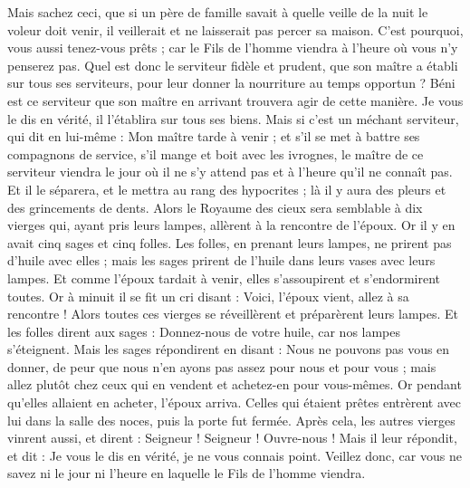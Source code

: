 \begin{multicols}{2}
Mais sachez ceci, que si un père de famille savait à quelle veille de la nuit le voleur doit venir, il veillerait et ne laisserait pas percer sa maison.
C'est pourquoi, vous aussi tenez-vous prêts ; car le Fils de l'homme viendra à l'heure où vous n'y penserez pas.
Quel est donc le serviteur fidèle et prudent, que son maître a établi sur tous ses serviteurs, pour leur donner la nourriture au temps opportun ?
Béni est ce serviteur que son maître en arrivant trouvera agir de cette manière.
Je vous le dis en vérité, il l'établira sur tous ses biens.
Mais si c'est un méchant serviteur, qui dit en lui-même : Mon maître tarde à venir ;
et s'il se met à battre ses compagnons de service, s'il mange et boit avec les ivrognes,
le maître de ce serviteur viendra le jour où il ne s'y attend pas et à l'heure qu'il ne connaît pas.
Et il le séparera, et le mettra au rang des hypocrites ; là il y aura des pleurs et des grincements de dents.
\VerseOne{}Alors le Royaume des cieux sera semblable à dix vierges qui, ayant pris leurs lampes, allèrent à la rencontre de l'époux.
Or il y en avait cinq sages et cinq folles.
Les folles, en prenant leurs lampes, ne prirent pas d'huile avec elles ;
mais les sages prirent de l'huile dans leurs vases avec leurs lampes.
Et comme l'époux tardait à venir, elles s'assoupirent et s'endormirent toutes.
Or à minuit il se fit un cri disant : Voici, l'époux vient, allez à sa rencontre !
Alors toutes ces vierges se réveillèrent et préparèrent leurs lampes.
Et les folles dirent aux sages : Donnez-nous de votre huile, car nos lampes s'éteignent.
Mais les sages répondirent en disant : Nous ne pouvons pas vous en donner, de peur que nous n'en ayons pas assez pour nous et pour vous ; mais allez plutôt chez ceux qui en vendent et achetez-en pour vous-mêmes.
Or pendant qu'elles allaient en acheter, l'époux arriva. Celles qui étaient prêtes entrèrent avec lui dans la salle des noces, puis la porte fut fermée.
Après cela, les autres vierges vinrent aussi, et dirent : Seigneur ! Seigneur ! Ouvre-nous !
Mais il leur répondit, et dit : Je vous le dis en vérité, je ne vous connais point.
Veillez donc, car vous ne savez ni le jour ni l'heure en laquelle le Fils de l'homme viendra.

\end{multicols}

